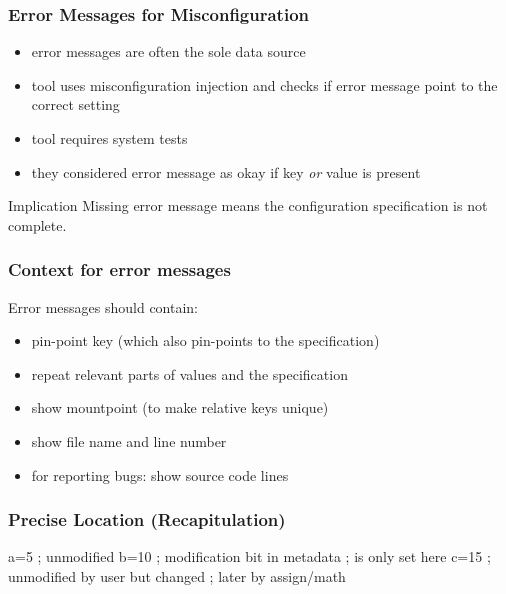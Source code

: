 \begin{frame}
	\frametitle{Error Messages for Misconfiguration~\cite{zhang2015proactive}}

	\begin{itemize}[<+-| alert@+>]
	\item error messages are often the sole data source
	\item tool uses misconfiguration injection and checks if error message point to the correct setting
	\item tool requires system tests
	\item they considered error message as okay if key \emph{or} value is present
	\end{itemize}

	\pause[\thebeamerpauses]  %

	\begin{alertblock}{Implication}
	Missing error message means the configuration specification is not complete.
	\end{alertblock}
\end{frame}

\begin{frame}
	\frametitle{Context for error messages}

	Error messages should contain:

	\begin{itemize}[<+-| alert@+>]
	\item pin-point key (which also pin-points to the specification)
	\item repeat relevant parts of values and the specification
	\item show mountpoint (to make relative keys unique)
	\item show file name and line number
	\item for reporting bugs: show source code lines
	\end{itemize}
\end{frame}

\begin{frame}[fragile]
	\frametitle{Precise Location (Recapitulation)}

	\begin{code}[language=CfgElektra,gobble=4]
	a=5  ; unmodified
	b=10 ; modification bit in metadata
	     ; is only set here
	c=15 ; unmodified by user but changed
	     ; later by assign/math
	\end{code}
\end{frame}

